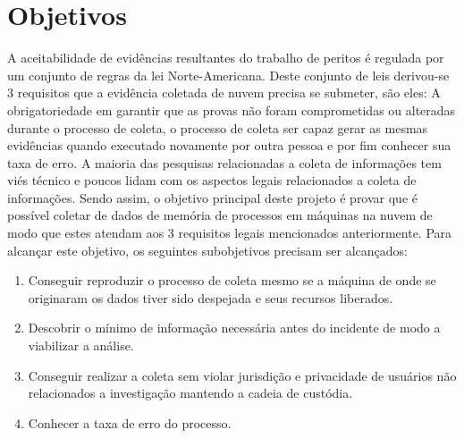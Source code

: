 \documentclass[12pt,				%
	openright,			%
	oneside,			%
	a4paper,			%
	english,			%
	brazil				%
	]{abntex2}
\begin{document}
\chapter{Objetivos} \label{chap:obj}
A aceitabilidade de evidências resultantes do trabalho de peritos é regulada por um conjunto de regras da lei Norte-Americana. Deste conjunto de leis derivou-se 3 requisitos que
a evidência coletada de nuvem precisa se submeter, são eles: A obrigatoriedade em garantir que as provas não foram comprometidas ou alteradas durante o processo de coleta, o processo
de coleta ser capaz gerar as mesmas evidências quando executado novamente por outra pessoa e por fim conhecer sua taxa de erro. A maioria das pesquisas relacionadas a coleta de 
informações tem viés técnico e poucos lidam com os aspectos legais relacionados a coleta de informações. Sendo assim, o objetivo principal deste projeto é provar que é possível 
coletar de dados de memória de processos em máquinas na nuvem de modo que estes atendam aos 3 requisitos legais mencionados anteriormente. Para alcançar este objetivo, os seguintes 
subobjetivos precisam ser alcançados:

\begin{enumerate}
 \item Conseguir reproduzir o processo de coleta mesmo se a máquina de onde se originaram os dados tiver sido despejada e seus recursos liberados.
 \item Descobrir o mínimo de informação necessária antes do incidente de modo a viabilizar a análise.
 \item Conseguir realizar a coleta sem violar jurisdição e privacidade de usuários não relacionados a investigação mantendo a cadeia de custódia.
 \item Conhecer a taxa de erro do processo.
\end{enumerate}
\end{document}
